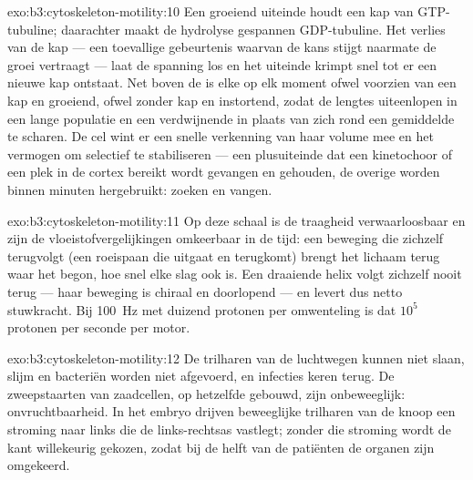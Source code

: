 \begin{solution}{exo:b3:cytoskeleton-motility:10}
Een groeiend uiteinde houdt een kap van GTP-tubuline; daarachter maakt
de hydrolyse gespannen GDP-tubuline. Het verlies van de kap --- een
toevallige gebeurtenis waarvan de kans stijgt naarmate de groei
vertraagt --- laat de spanning los en het uiteinde krimpt snel tot er
een nieuwe kap ontstaat. Net boven de  is elke
 op elk moment ofwel voorzien van een kap en groeiend,
ofwel zonder kap en instortend, zodat de lengtes uiteenlopen in een
lange populatie en een verdwijnende in plaats van zich rond een
gemiddelde te scharen. De cel wint er een snelle verkenning van haar
volume mee en het vermogen om selectief te stabiliseren --- een
plusuiteinde dat een kinetochoor of een plek in de cortex bereikt wordt
gevangen en gehouden, de overige worden binnen minuten hergebruikt:
zoeken en vangen.
\end{solution}

\begin{solution}{exo:b3:cytoskeleton-motility:11}
Op deze schaal is de traagheid verwaarloosbaar en zijn de
vloeistofvergelijkingen omkeerbaar in de tijd: een beweging die
zichzelf terugvolgt (een roeispaan die uitgaat en terugkomt) brengt het
lichaam terug waar het begon, hoe snel elke slag ook is. Een draaiende
helix volgt zichzelf nooit terug --- haar beweging is chiraal en
doorlopend --- en levert dus netto stuwkracht. Bij \qty{100}{Hz} met
duizend protonen per omwenteling is dat $10^{5}$ protonen per seconde
per motor.
\end{solution}

\begin{solution}{exo:b3:cytoskeleton-motility:12}
De trilharen van de luchtwegen kunnen niet slaan, slijm en bacteriën
worden niet afgevoerd, en infecties keren terug. De zweepstaarten van
zaadcellen, op hetzelfde  gebouwd, zijn onbeweeglijk:
onvruchtbaarheid. In het embryo drijven beweeglijke trilharen van de
knoop een stroming naar links die de links-rechtsas vastlegt; zonder
die stroming wordt de kant willekeurig gekozen, zodat bij de helft van
de patiënten de organen zijn omgekeerd.
\end{solution}

